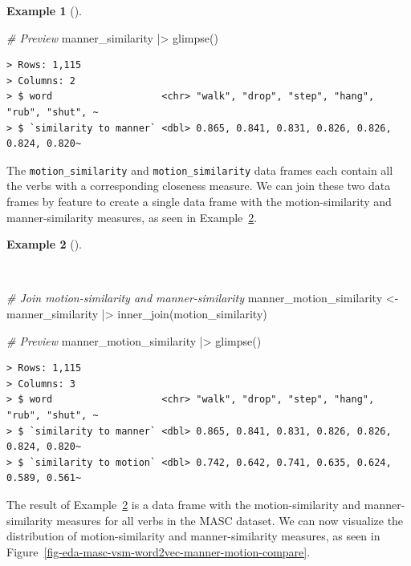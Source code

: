 \documentclass[
  letterpaper,
]{latex/krantz}
\newenvironment{Shaded}{\begin{snugshade}}{\end{snugshade}}
\newcommand{\CommentTok}[1]{\textcolor[rgb]{0.00,0.00,0.00}{\textit{#1}}}
\newcommand{\FunctionTok}[1]{\textcolor[rgb]{0.00,0.00,0.00}{#1}}
\newcommand{\NormalTok}[1]{\textcolor[rgb]{0.00,0.00,0.00}{#1}}
\newcommand{\OtherTok}[1]{\textcolor[rgb]{0.00,0.00,0.00}{#1}}
\newcommand{\SpecialCharTok}[1]{\textcolor[rgb]{0.00,0.00,0.00}{#1}}
\theoremstyle{definition}
\newtheorem{example}{Example}[chapter]
\theoremstyle{remark}
\begin{document}
\begin{example}[]
\begin{Shaded}
\begin{Highlighting}[]
\CommentTok{\# Preview}
\NormalTok{manner\_similarity }\SpecialCharTok{|\textgreater{}} \FunctionTok{glimpse}\NormalTok{()}
\end{Highlighting}
\end{Shaded}

\begin{verbatim}
> Rows: 1,115
> Columns: 2
> $ word                   <chr> "walk", "drop", "step", "hang", "rub", "shut", ~
> $ `similarity to manner` <dbl> 0.865, 0.841, 0.831, 0.826, 0.826, 0.824, 0.820~
\end{verbatim}

\end{example}

The \texttt{motion\_similarity} and \texttt{motion\_similarity} data
frames each contain all the verbs with a corresponding closeness
measure. We can join these two data frames by feature to create a single
data frame with the motion-similarity and manner-similarity measures, as
seen in Example~\ref{exm-eda-masc-vsm-word2vec-manner-motion}.

\begin{example}[]\protect\hypertarget{exm-eda-masc-vsm-word2vec-manner-motion}{}\label{exm-eda-masc-vsm-word2vec-manner-motion}

~

\begin{Shaded}
\begin{Highlighting}[]
\CommentTok{\# Join motion{-}similarity and manner{-}similarity}
\NormalTok{manner\_motion\_similarity }\OtherTok{\textless{}{-}}
\NormalTok{  manner\_similarity }\SpecialCharTok{|\textgreater{}}
  \FunctionTok{inner\_join}\NormalTok{(motion\_similarity)}

\CommentTok{\# Preview}
\NormalTok{manner\_motion\_similarity }\SpecialCharTok{|\textgreater{}} \FunctionTok{glimpse}\NormalTok{()}
\end{Highlighting}
\end{Shaded}

\begin{verbatim}
> Rows: 1,115
> Columns: 3
> $ word                   <chr> "walk", "drop", "step", "hang", "rub", "shut", ~
> $ `similarity to manner` <dbl> 0.865, 0.841, 0.831, 0.826, 0.826, 0.824, 0.820~
> $ `similarity to motion` <dbl> 0.742, 0.642, 0.741, 0.635, 0.624, 0.589, 0.561~
\end{verbatim}

\end{example}

The result of Example~\ref{exm-eda-masc-vsm-word2vec-manner-motion} is a
data frame with the motion-similarity and manner-similarity measures for
all verbs in the MASC dataset. We can now visualize the distribution of
motion-similarity and manner-similarity measures, as seen in
Figure~\ref{fig-eda-masc-vsm-word2vec-manner-motion-compare}.
\end{document}
